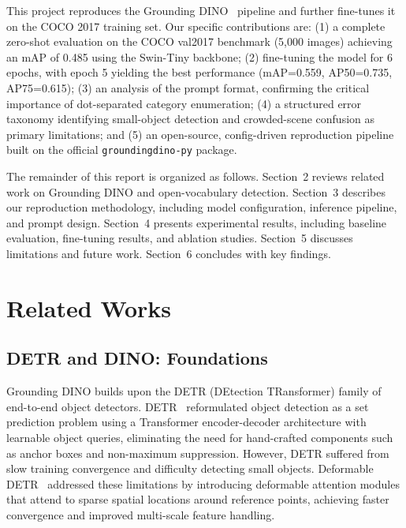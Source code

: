 \documentclass[10pt,journal,final,twocolumn]{IEEEtran}
\begin{document}
This project reproduces the Grounding DINO~\cite{Liu23} pipeline and further fine-tunes it on the COCO 2017 training set. Our specific contributions are: (1) a complete zero-shot evaluation on the COCO val2017 benchmark (5,000 images) achieving an mAP of 0.485 using the Swin-Tiny backbone; (2) fine-tuning the model for 6 epochs, with epoch 5 yielding the best performance (mAP=0.559, AP50=0.735, AP75=0.615); (3) an analysis of the prompt format, confirming the critical importance of dot-separated category enumeration; (4) a structured error taxonomy identifying small-object detection and crowded-scene confusion as primary limitations; and (5) an open-source, config-driven reproduction pipeline built on the official \texttt{groundingdino-py} package.

The remainder of this report is organized as follows. Section~2 reviews related work on Grounding DINO and open-vocabulary detection. Section~3 describes our reproduction methodology, including model configuration, inference pipeline, and prompt design. Section~4 presents experimental results, including baseline evaluation, fine-tuning results, and ablation studies. Section~5 discusses limitations and future work. Section~6 concludes with key findings.

\section{Related Works}

\subsection{DETR and DINO: Foundations}

Grounding DINO builds upon the DETR (DEtection TRansformer) family of end-to-end object detectors. DETR~\cite{Carion20} reformulated object detection as a set prediction problem using a Transformer encoder-decoder architecture with learnable object queries, eliminating the need for hand-crafted components such as anchor boxes and non-maximum suppression. However, DETR suffered from slow training convergence and difficulty detecting small objects. Deformable DETR~\cite{Zhu21} addressed these limitations by introducing deformable attention modules that attend to sparse spatial locations around reference points, achieving faster convergence and improved multi-scale feature handling.
\end{document}
